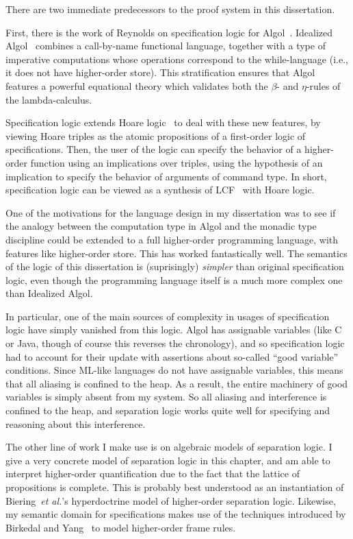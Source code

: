 There are two immediate predecessors to the proof system in this
dissertation. 

First, there is the work of Reynolds on specification logic for
Algol~\cite{spec-logic}. Idealized Algol~\cite{idealized-algol}
combines a call-by-name functional language, together with a type of
imperative computations whose operations correspond to the
while-language (i.e., it does not have higher-order store). This
stratification ensures that Algol features a powerful equational
theory which validates both the $\beta$- and $\eta$-rules of the
lambda-calculus. 

Specification logic extends Hoare logic~\cite{hoare-logic} to deal
with these new features, by viewing Hoare triples as the atomic
propositions of a first-order logic of specifications. Then, the user
of the logic can specify the behavior of a higher-order function using
an implications over triples, using the hypothesis of an implication
to specify the behavior of arguments of command type. In short,
specification logic can be viewed as a synthesis of LCF~\cite{lcf} with
  Hoare logic.

One of the motivations for the language design in my dissertation was
to see if the analogy between the computation type in Algol and the
monadic type discipline could be extended to a full higher-order
programming language, with features like higher-order store. This has
worked fantastically well. The semantics of the logic of this
dissertation is (suprisingly) \emph{simpler} than original
specification logic, even though the programming language itself is a
much more complex one than Idealized Algol.

In particular, one of the main sources of complexity in usages of
specification logic have simply vanished from this logic. Algol has
assignable variables (like C or Java, though of course this reverses
the chronology), and so specification logic had to account for their
update with assertions about so-called ``good variable''
conditions. Since ML-like languages do not have assignable variables,
this means that all aliasing is confined to the heap. As a result, the
entire machinery of good variables is simply absent from my system.
So all aliasing and interference is confined to the heap, and
separation logic works quite well for specifying and reasoning about
this interference.

The other line of work I make use is on algebraic models of separation
logic. I give a very concrete model of separation logic in this
chapter, and am able to interpret higher-order quantification due to
the fact that the lattice of propositions is complete. This is
probably best understood as an instantiation of Biering~\emph{et
  al.}'s hyperdoctrine model of higher-order separation
logic. Likewise, my semantic domain for specifications makes use of
the techniques introduced by Birkedal and Yang~\cite{birkedal-yang} to
model higher-order frame rules.


